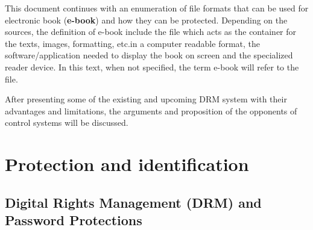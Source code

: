 \documentclass[11pt,a4paper,oneside]{memoir}
\begin{document}
This document continues with an enumeration of file formats that can be used for electronic book (\textbf{e-book}) and how they can be protected. Depending on the sources, the definition of e-book include the file \textemdash which acts as the container for the texts, images, formatting, etc.\textemdash in a computer readable format, the software/application needed to display the book on screen and the specialized reader device. In this text, when not specified, the term e-book will refer to the file.

After presenting some of the existing and upcoming DRM system with their advantages and limitations, the arguments and proposition of the opponents of control systems will be discussed.

\chapter{Protection and identification}

\section{Digital Rights Management (DRM) and Password Protections}\label{def:drm}
\end{document}

